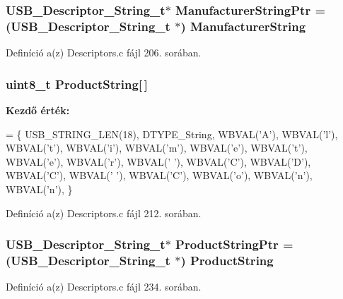 \subsubsection[{Manufacturer\-String\-Ptr}]{\setlength{\rightskip}{0pt plus 5cm}U\-S\-B\-\_\-\-Descriptor\-\_\-\-String\-\_\-t$\ast$ Manufacturer\-String\-Ptr = (U\-S\-B\-\_\-\-Descriptor\-\_\-\-String\-\_\-t $\ast$) {\bf Manufacturer\-String}}\label{_descriptors_8c_a48338794dea700974f8b0b043d0a4d60}


Definíció a(z) Descriptors.\-c fájl 206. sorában.

\subsubsection[{Product\-String}]{\setlength{\rightskip}{0pt plus 5cm}uint8\-\_\-t Product\-String[$\,$]}\label{_descriptors_8c_afb016d49474419471ed53243c36007f6}
{\bfseries Kezdő érték\-:}
\begin{DoxyCode}
= \{
    USB\_STRING\_LEN(18),
    DTYPE\_String,
    WBVAL(\textcolor{charliteral}{'A'}),
    WBVAL(\textcolor{charliteral}{'l'}),
    WBVAL(\textcolor{charliteral}{'t'}),
    WBVAL(\textcolor{charliteral}{'i'}),
    WBVAL(\textcolor{charliteral}{'m'}),
    WBVAL(\textcolor{charliteral}{'e'}),
    WBVAL(\textcolor{charliteral}{'t'}),
    WBVAL(\textcolor{charliteral}{'e'}),
    WBVAL(\textcolor{charliteral}{'r'}),
    WBVAL(\textcolor{charliteral}{' '}),
    WBVAL(\textcolor{charliteral}{'C'}),
    WBVAL(\textcolor{charliteral}{'D'}),
    WBVAL(\textcolor{charliteral}{'C'}),
    WBVAL(\textcolor{charliteral}{' '}),
    WBVAL(\textcolor{charliteral}{'C'}),
    WBVAL(\textcolor{charliteral}{'o'}),
    WBVAL(\textcolor{charliteral}{'n'}),
    WBVAL(\textcolor{charliteral}{'n'}),
\}
\end{DoxyCode}


Definíció a(z) Descriptors.\-c fájl 212. sorában.

\subsubsection[{Product\-String\-Ptr}]{\setlength{\rightskip}{0pt plus 5cm}U\-S\-B\-\_\-\-Descriptor\-\_\-\-String\-\_\-t$\ast$ Product\-String\-Ptr = (U\-S\-B\-\_\-\-Descriptor\-\_\-\-String\-\_\-t $\ast$) {\bf Product\-String}}\label{_descriptors_8c_aa7a5f39bd07b0c4ded3f6f7f797b1d92}


Definíció a(z) Descriptors.\-c fájl 234. sorában.

